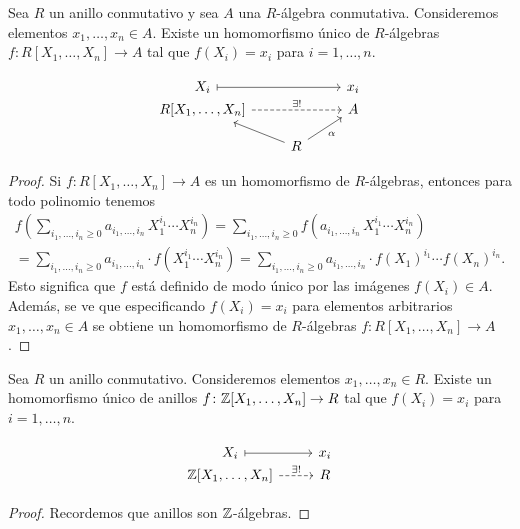 \begin{proposicion}
  Sea $R$ un anillo conmutativo y sea $A$ una $R$-álgebra
  conmutativa. Consideremos elementos $x_1,\ldots,x_n \in A$. Existe
  un homomorfismo único de $R$-álgebras $f\colon R [X_1,\ldots,X_n] \to A$
  tal que $f (X_i) = x_i$ para $i = 1,\ldots,n$.

  \[ \begin{tikzcd}[row sep=0pt]
      X_i \ar[|->]{rr} && x_i \\
      R [X_1,\ldots,X_n] \ar[dashed]{rr}{\exists !} && A \\[1em]
      & R\ar{ul}\ar{ur}[swap]{\alpha}
    \end{tikzcd} \]

  \begin{proof}
    Si $f\colon R [X_1,\ldots,X_n] \to A$ es un homomorfismo de $R$-álgebras,
    entonces para todo polinomio tenemos
    \begin{multline*}
      f \left(\sum_{i_1,\ldots,i_n\ge 0} a_{i_1,\ldots,i_n} \, X_1^{i_1} \cdots X_n^{i_n}\right) =
      \sum_{i_1,\ldots,i_n\ge 0} f \left(a_{i_1,\ldots,i_n} \, X_1^{i_1} \cdots X_n^{i_n}\right) \\
      = \sum_{i_1,\ldots,i_n\ge 0} a_{i_1,\ldots,i_n} \cdot f (X_1^{i_1} \cdots X_n^{i_n}) =
      \sum_{i_1,\ldots,i_n\ge 0} a_{i_1,\ldots,i_n} \cdot f (X_1)^{i_1} \cdots f (X_n)^{i_n}.
    \end{multline*}
    Esto significa que $f$ está definido de modo único por las imágenes
    $f (X_i) \in A$. Además, se ve que especificando $f (X_i) = x_i$ para
    elementos arbitrarios $x_1,\ldots,x_n \in A$ se obtiene un homomorfismo
    de $R$-álgebras $f\colon R [X_1,\ldots,X_n] \to A$.
  \end{proof}
\end{proposicion}

\begin{corolario}
  Sea $R$ un anillo conmutativo. Consideremos elementos
  $x_1,\ldots,x_n \in R$. Existe un homomorfismo único de anillos
  $f\colon \mathbb{Z} [X_1,\ldots,X_n] \to R$ tal que $f (X_i) = x_i$ para
  $i = 1,\ldots,n$.

  \[ \begin{tikzcd}[row sep=0pt]
      X_i \ar[|->]{r} & x_i \\
      \ZZ [X_1,\ldots,X_n] \ar[dashed]{r}{\exists !} & R
    \end{tikzcd} \]

  \begin{proof}
    Recordemos que anillos son $\mathbb{Z}$-álgebras.
  \end{proof}
\end{corolario}

